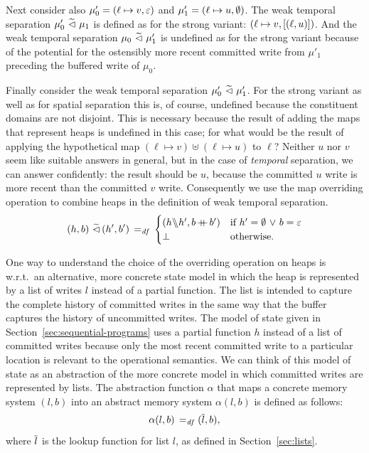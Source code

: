 \documentclass[11pt]{report}
\begin{document}
Next consider also $\mu'_0 = (\ell \mapsto v,\varepsilon)$ and $\mu'_1 = (\ell \mapsto u, \operatorname{\emptyset})$. The weak temporal separation $\mu'_0 \operatorname{\,\widetilde{\vartriangleleft}\,} \mu_1$ is defined as for the strong variant: $(\ell \mapsto v, \left[(\ell,u)\right])$. And the weak temporal separation $\mu_0 \operatorname{\,\widetilde{\vartriangleleft}\,} \mu'_1$ is undefined as for the strong variant because of the potential for the ostensibly more recent committed write from $\mu'_1$ preceding the buffered write of $\mu_0$. 

Finally consider the weak temporal separation $\mu'_0 \operatorname{\,\widetilde{\vartriangleleft}\,} \mu'_1$. For the strong variant as well as for spatial separation this is, of course, undefined because the constituent domains are not disjoint. This is necessary because the result of adding the maps that represent heaps is  undefined in this case; for what would be the result of applying the hypothetical map $(\ell \mapsto v) \uplus (\ell \mapsto u)$ to $\ell$? Neither $u$ nor $v$ seem like suitable answers in general, but in the case of \emph{temporal} separation, we can answer confidently: the result should be $u$, because the committed $u$ write is more recent than the committed $v$ write. Consequently we use the map overriding operation to combine heaps in the definition of weak temporal separation. 
\[ (h,b) \operatorname{\,\widetilde{\vartriangleleft}\,} (h',b') \operatorname{\;=_{\mathit{df}}\;} \begin{cases}
(h \backslash\!\!\backslash h', b \operatorname{+\!\!\!+} b') & \text{if $h' = \operatorname{\emptyset} \operatorname{\,\vee\,} b = \varepsilon$} \\
\bot & \text{otherwise.}
\end{cases}\]

One way to understand the choice of the overriding operation on heaps is w.r.t.\ an alternative, more concrete state model in which the heap is represented by a list of writes $l$ instead of a partial function. The list is intended to capture the complete history of committed writes in the same way that the buffer captures the history of uncommitted writes. The model of state given in Section~\ref{sec:sequential-programs} uses a partial function $h$ instead of a list of committed writes because only the most recent committed write to a particular location is relevant to the operational semantics. We can think of this model of state as an abstraction of the more concrete model in which committed writes are represented by lists. The abstraction function $\alpha$ that maps a concrete memory system $(l,b)$ into an abstract memory system $\alpha(l,b)$ is defined as follows:  \[ \alpha(l,b) \operatorname{\;=_{\mathit{df}}\;} (\overline{l},b),\] where $\overline{l}$ is the lookup function for list $l$, as defined in Section~\ref{sec:lists}. 
\end{document}
